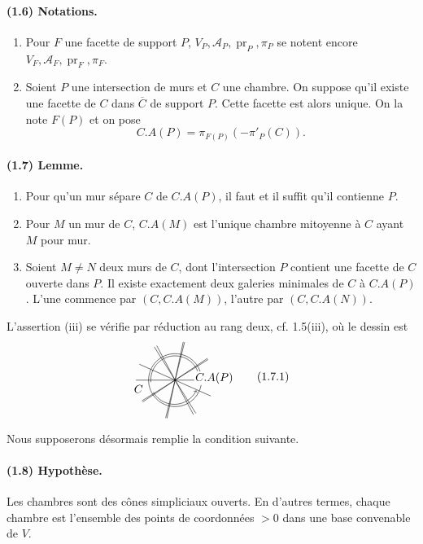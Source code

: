 \documentclass[10pt]{article}
\newcommand{\cl}[1]{\overline{#1}}
\newcommand{\mcA}{\mathcal A}
\begin{document}
\paragraph{(1.6) Notations.} \begin{enumerate}[label=(\roman*)]
\item Pour $F$ une facette de support $P$, $V_P,\mcA_P,\operatorname{pr}_P,\pi_P$ se notent encore $V_F,\mcA_F,\operatorname{pr}_F,\pi_F$.
\item Soient $P$ une intersection de murs et $C$ une chambre. On suppose qu'il existe une facette de $C$ dans $\cl C$ de support $P$. Cette facette est alors unique. On la note $F(P)$ et on pose
\[
C.A(P)=\pi_{F(P)}(-\pi'_P(C)).
\]
\end{enumerate}

\paragraph{(1.7) Lemme.} \begin{enumerate}[label=(\roman*)]
\item Pour qu'un mur sépare $C$ de $C.A(P)$, il faut et il suffit qu'il contienne $P$.
\item Pour $M$ un mur de $C$, $C.A(M)$ est l'unique chambre mitoyenne à $C$ ayant $M$ pour mur.
\item Soient $M\ne N$ deux murs de $C$, dont l'intersection $P$ contient une facette de $C$ ouverte dans $P$. Il existe exactement deux galeries minimales de $C$ à $C.A(P)$. L'une commence par $(C,C.A(M))$, l'autre par $(C,C.A(N))$.
\end{enumerate}
L'assertion (iii) se vérifie par réduction au rang deux, cf. 1.5(iii), où le dessin est
\[
\begin{tikzpicture}[scale=0.78,baseline={(0,0)}]
\draw (0,0) circle (1.05);
\foreach \a in {0,32,76,118,156,214,258,302}
  {\draw ({1.55*cos(\a)},{1.55*sin(\a)})--({-1.55*cos(\a)},{-1.55*sin(\a)});}
\draw[->] (-0.96,-0.08) arc[start angle=185,end angle=15,radius=0.96];
\draw[->] (-0.86,-0.48) arc[start angle=210,end angle=335,radius=0.96];
\node[fill=white,inner sep=1pt] at (-1.45,-0.35) {$C$};
\node[fill=white,inner sep=1pt] at (1.55,0.08) {$C.A(P)$};
\end{tikzpicture}
\tag{1.7.1}
\]

Nous supposerons désormais remplie la condition suivante.

\paragraph{(1.8) Hypothèse.} Les chambres sont des cônes simpliciaux ouverts. En d'autres termes, chaque chambre est l'ensemble des points de coordonnées $>0$ dans une base convenable de $V$.
\end{document}
